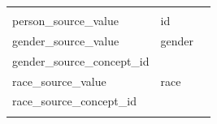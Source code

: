 \documentclass[11pt]{book}
\theoremstyle{definition}
\theoremstyle{definition}
\theoremstyle{definition}
\theoremstyle{remark}
\begin{document}
\begin{longtable}[]{@{}lll@{}}
\begin{minipage}[t]{0.51\columnwidth}
\strut
\end{minipage}\tabularnewline
\begin{minipage}[t]{0.28\columnwidth}\raggedright
person\_source\_value\strut
\end{minipage} & \begin{minipage}[t]{0.12\columnwidth}\raggedright
id\strut
\end{minipage} & \begin{minipage}[t]{0.51\columnwidth}\raggedright
\strut
\end{minipage}\tabularnewline
\begin{minipage}[t]{0.28\columnwidth}\raggedright
gender\_source\_value\strut
\end{minipage} & \begin{minipage}[t]{0.12\columnwidth}\raggedright
gender\strut
\end{minipage} & \begin{minipage}[t]{0.51\columnwidth}\raggedright
\strut
\end{minipage}\tabularnewline
\begin{minipage}[t]{0.28\columnwidth}\raggedright
gender\_source\_concept\_id\strut
\end{minipage} & \begin{minipage}[t]{0.12\columnwidth}\raggedright
\strut
\end{minipage} & \begin{minipage}[t]{0.51\columnwidth}\raggedright
\strut
\end{minipage}\tabularnewline
\begin{minipage}[t]{0.28\columnwidth}\raggedright
race\_source\_value\strut
\end{minipage} & \begin{minipage}[t]{0.12\columnwidth}\raggedright
race\strut
\end{minipage} & \begin{minipage}[t]{0.51\columnwidth}\raggedright
\strut
\end{minipage}\tabularnewline
\begin{minipage}[t]{0.28\columnwidth}\raggedright
race\_source\_concept\_id\strut
\end{minipage} & \begin{minipage}[t]{0.12\columnwidth}\raggedright
\strut
\end{minipage} & \begin{minipage}[t]{0.51\columnwidth}\raggedright
\strut
\end{minipage}\tabularnewline
\begin{minipage}[t]{0.28\columnwidth}\raggedright

\end{minipage}
\end{longtable}
\end{document}
